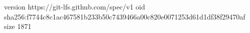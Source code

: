 version https://git-lfs.github.com/spec/v1
oid sha256:f7744c8c1ac467581b233b50c7439466a00c820e0071253d61d1df38f29470af
size 1871
